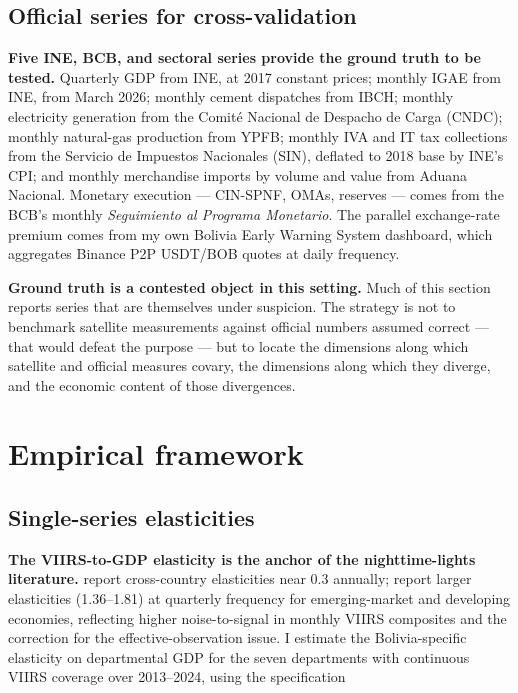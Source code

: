 \documentclass[11pt,letterpaper]{article}
\newcommand{\claim}[1]{\textbf{#1.}}
\begin{document}
\subsection{Official series for cross-validation}

\claim{Five INE, BCB, and sectoral series provide the ground truth to be tested} Quarterly GDP from INE, at \num{2017} constant prices; monthly IGAE from INE, from March \num{2026}; monthly cement dispatches from IBCH; monthly electricity generation from the Comité Nacional de Despacho de Carga (CNDC); monthly natural-gas production from YPFB; monthly IVA and IT tax collections from the Servicio de Impuestos Nacionales (SIN), deflated to \num{2018} base by INE's CPI; and monthly merchandise imports by volume and value from Aduana Nacional. Monetary execution --- CIN-SPNF, OMAs, reserves --- comes from the BCB's monthly \emph{Seguimiento al Programa Monetario}. The parallel exchange-rate premium comes from my own Bolivia Early Warning System dashboard, which aggregates Binance P2P USDT/BOB quotes at daily frequency.

\claim{Ground truth is a contested object in this setting} Much of this section reports series that are themselves under suspicion. The strategy is not to benchmark satellite measurements against official numbers assumed correct --- that would defeat the purpose --- but to locate the dimensions along which satellite and official measures covary, the dimensions along which they diverge, and the economic content of those divergences.

\section{Empirical framework}
\label{sec:empirical}

\subsection{Single-series elasticities}

\claim{The VIIRS-to-GDP elasticity is the anchor of the nighttime-lights literature} \citet{hsw2012} report cross-country elasticities near \num{0.3} annually; \citet{beyer_hu_yao2022} report larger elasticities (\numrange{1.36}{1.81}) at quarterly frequency for emerging-market and developing economies, reflecting higher noise-to-signal in monthly VIIRS composites and the correction for the effective-observation issue. I estimate the Bolivia-specific elasticity on departmental GDP for the seven departments with continuous VIIRS coverage over \numrange{2013}{2024}, using the specification
\end{document}
